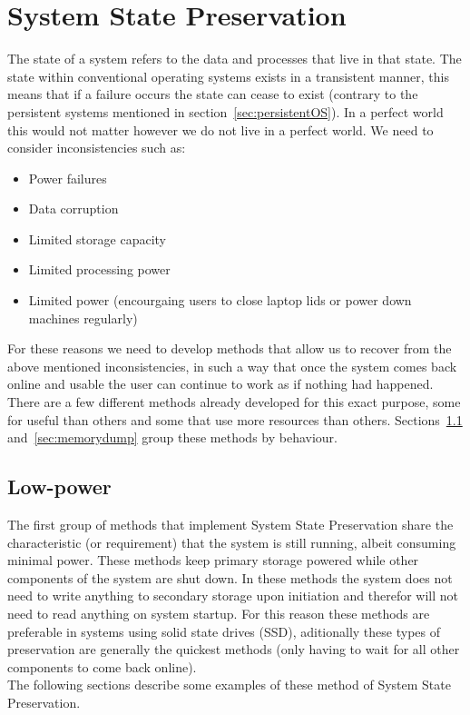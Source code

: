 \documentclass[a4,12pt]{article}
\begin{document}
\section{System State Preservation}\label{sec:preservation}
The state of a system refers to the data and processes that live in that state. The state within conventional operating systems exists in a transistent manner, this means that if a failure occurs the state can cease to exist (contrary to the persistent systems mentioned in section~\ref{sec:persistentOS}). In a perfect world this would not matter however we do not live in a perfect world. We need to consider inconsistencies such as:
\begin{itemize}
    \item{Power failures}
    \item{Data corruption}
    \item{Limited storage capacity}
    \item{Limited processing power}
    \item{Limited power (encourgaing users to close laptop lids or power down machines regularly)}
\end{itemize}
For these reasons we need to develop methods that allow us to recover from the above mentioned inconsistencies, in such a way that once the system comes back online and usable the user can continue to work as if nothing had happened.
\\There are a few different methods already developed for this exact purpose, some for useful than others and some that use more resources than others. Sections~\ref{sec:lowpower} and~\ref{sec:memorydump} group these methods by behaviour.

\subsection{Low-power}\label{sec:lowpower}
The first group of methods that implement System State Preservation share the characteristic (or requirement) that the system is still running, albeit consuming minimal power. These methods keep primary storage powered while other components of the system are shut down. In these methods the system does not need to write anything to secondary storage upon initiation and therefor will not need to read anything on system startup. For this reason these methods are preferable in systems using solid state drives (SSD), aditionally these types of preservation are generally the quickest methods (only having to wait for all other components to come back online).
\\The following sections describe some examples of these method of System State Preservation.
\end{document}
